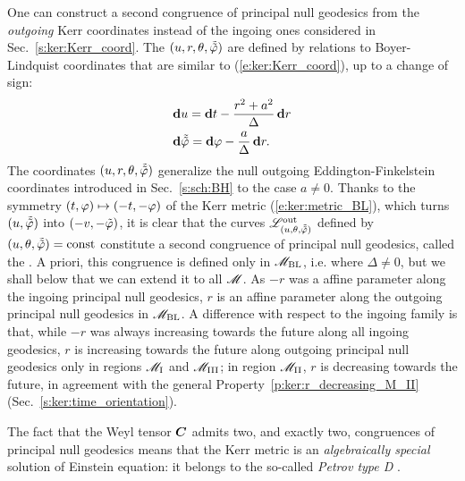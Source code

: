 One can construct a second congruence of principal null geodesics from
the \emph{outgoing} Kerr coordinates instead of the ingoing ones
considered in Sec.~\ref{s:ker:Kerr_coord}. The
$(u,r,\theta,\tilde{{\tilde\varphi}})$ are defined by relations to Boyer-Lindquist
coordinates that are similar to
(\ref{e:ker:Kerr_coord}), up to a change of sign:
\begin{subequations}
\label{e:ker:out_Kerr_coord}
\begin{align}
& \mathbf{d} u = \mathbf{d} t - \frac{r^2+a^2}{\Delta} \, \mathbf{d} r \\
& \mathbf{d} \tilde{{\tilde\varphi}} = \mathbf{d} \varphi - \frac{a}{\Delta}\, \mathbf{d} r .
\end{align}
\end{subequations}
The coordinates $(u,r,\theta,\tilde{{\tilde\varphi}})$ generalize the null
outgoing Eddington-Finkelstein
coordinates introduced in Sec.~\ref{s:sch:BH} to the case $a\not=0$.
Thanks to the symmetry $(t,\varphi)\mapsto(-t,-\varphi)$ of the Kerr metric (\ref{e:ker:metric_BL}), which turns $(u,\tilde{{\tilde\varphi}})$ into $(-v,-{\tilde\varphi})$, it is clear that the
curves $\mathscr{L}^{\rm out}_{(u,\theta,\tilde{{\tilde\varphi}})}$
defined by $(u,\theta,\tilde{{\tilde\varphi}})=\mathrm{const}$ constitute a second
congruence of principal null geodesics, called the .
A priori, this congruence is defined only in $\mathscr{M}_{\rm BL}$, i.e. where $\Delta\neq 0$,
but we shall below that we can extend it to all $\mathscr{M}$.
As $-r$ was a affine parameter along
the ingoing principal null geodesics, $r$ is an affine parameter along
the outgoing principal null geodesics in $\mathscr{M}_{\rm BL}$.
A difference with respect to the ingoing family is that, while $-r$ was always
increasing towards the future along all ingoing geodesics,
 $r$ is increasing towards the future
along outgoing principal null geodesics only in regions
$\mathscr{M}_{\rm I}$ and $\mathscr{M}_{\rm III}$; in region $\mathscr{M}_{\rm II}$,
$r$ is decreasing towards the future, in agreement with the general
Property~\ref{p:ker:r_decreasing_M_II} (Sec.~\ref{s:ker:time_orientation}).

The fact that the Weyl tensor $\bm{C}$
admits two, and exactly two, congruences of principal null geodesics
means that the Kerr metric is an \emph{algebraically special} solution of
Einstein equation: it belongs to the so-called \emph{Petrov type D}
\cite{ONeil95}.

